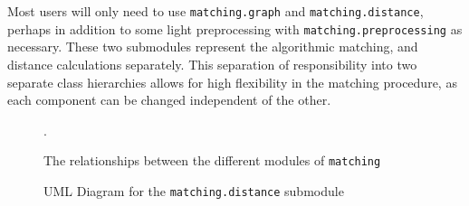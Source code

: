 \documentclass[11pt]{extarticle}
\begin{document}
Most users will only need to use \texttt{matching.graph} and \texttt{matching.distance}, perhaps in addition to some light preprocessing with \texttt{matching.preprocessing} as necessary.
These two submodules represent the algorithmic matching, and distance calculations separately.
This separation of responsibility into two separate class hierarchies allows for high flexibility in the matching procedure, as each component can be changed independent of the other.

\begin{figure}[h!]
  \caption{\label{fig:arch_flow} The relationships between the different modules of \texttt{matching}}.
\end{figure}

\begin{figure}[h!]
  \caption{\label{fig:distance_uml} UML Diagram for the \texttt{matching.distance} submodule}
\end{figure}
\end{document}
